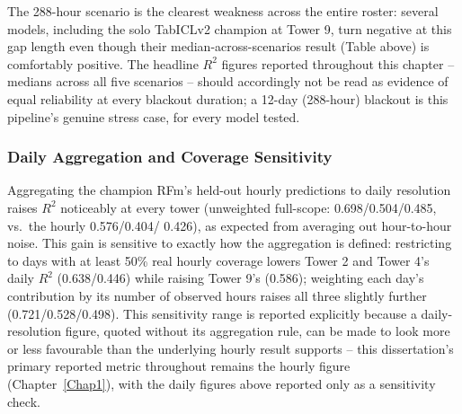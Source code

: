 \begin{table}[h]
\centering
\footnotesize
{}
\caption{$R^2$ by gap-length scenario, each cell T2/T4/T9.}
\end{table}

The 288-hour scenario is the clearest weakness across the entire roster: several models, including
the solo TabICLv2 champion at Tower 9, turn negative at this gap length even though their
median-across-scenarios result (Table above) is comfortably positive. The headline $R^2$ figures
reported throughout this chapter -- medians across all five scenarios -- should accordingly not be
read as evidence of equal reliability at every blackout duration; a 12-day (288-hour) blackout is
this pipeline's genuine stress case, for every model tested.

\subsubsection{Daily Aggregation and Coverage Sensitivity}

Aggregating the champion RFm's held-out hourly predictions to daily resolution raises $R^2$
noticeably at every tower (unweighted full-scope: 0.698/0.504/0.485, vs.\ the hourly 0.576/0.404/
0.426), as expected from averaging out hour-to-hour noise. This gain is sensitive to exactly how the
aggregation is defined: restricting to days with at least 50\% real hourly coverage lowers Tower 2
and Tower 4's daily $R^2$ (0.638/0.446) while raising Tower 9's (0.586); weighting each day's
contribution by its number of observed hours raises all three slightly further (0.721/0.528/0.498).
This sensitivity range is reported explicitly because a daily-resolution figure, quoted without its
aggregation rule, can be made to look more or less favourable than the underlying hourly result
supports -- this dissertation's primary reported metric throughout remains the hourly figure
(Chapter~\ref{Chap1}), with the daily figures above reported only as a sensitivity check.

